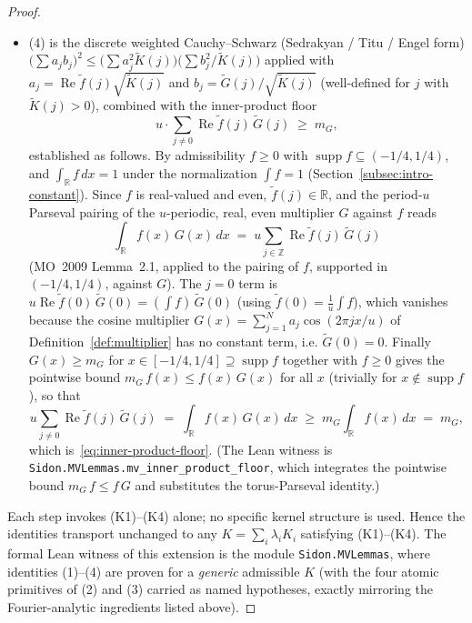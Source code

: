 \documentclass[11pt, letterpaper]{article}
\theoremstyle{paperplain}
\theoremstyle{paperdef}
\newcommand{\R}{\mathbb{R}}
\newcommand{\Z}{\mathbb{Z}}
\newcommand{\supp}{\operatorname{supp}}
\begin{document}
\begin{proof}
\begin{itemize}[leftmargin=2em]
       alone suffices and follows from $\widetilde{K}(j)\ge 0$ (K4)
       without the full period-$u$ summation.
\item (4) is the discrete weighted Cauchy--Schwarz
       (Sedrakyan / Titu / Engel form)
       $\bigl(\sum a_j b_j\bigr)^{2}\le\bigl(\sum a_j^{2}\widetilde{K}(j)\bigr)\bigl(\sum b_j^{2}/\widetilde{K}(j)\bigr)$
       applied with
       $a_j=\operatorname{Re}\widetilde{f}(j)\sqrt{\widetilde{K}(j)}$ and
       $b_j=\widetilde{G}(j)/\sqrt{\widetilde{K}(j)}$
       (well-defined for $j$ with $\widetilde{K}(j)>0$),
       combined with the inner-product floor
       \begin{equation}\label{eq:inner-product-floor}
         u\cdot\sum_{j\ne 0}\operatorname{Re}\widetilde{f}(j)\,\widetilde{G}(j)\;\ge\; m_G,
       \end{equation}
       established as follows.  By admissibility $f\ge 0$ with
       $\supp f\subseteq(-1/4,1/4)$, and $\int_{\R}f\,dx=1$ under the
       normalization $\int f=1$ (Section~\ref{subsec:intro-constant}).
       Since $f$ is real-valued and even, $\widetilde{f}(j)\in\R$, and
       the period-$u$ Parseval pairing of the $u$-periodic, real,
       even multiplier $G$ against $f$ reads
       \[
         \int_{\R}f(x)\,G(x)\,dx
         \;=\;u\sum_{j\in\Z}\operatorname{Re}\widetilde{f}(j)\,\widetilde{G}(j)
       \]
       (MO~2009 Lemma~2.1, applied to the pairing of $f$, supported in
       $(-1/4,1/4)$, against $G$).  The $j=0$ term is
       $u\operatorname{Re}\widetilde{f}(0)\,\widetilde{G}(0)=(\int f)\,\widetilde{G}(0)$
       (using $\widetilde{f}(0)=\tfrac1u\int f$),
       which vanishes because the cosine multiplier
       $G(x)=\sum_{j=1}^{N}a_j\cos(2\pi jx/u)$ of
       Definition~\ref{def:multiplier} has no constant term, i.e.
       $\widetilde{G}(0)=0$.  Finally $G(x)\ge m_G$ for
       $x\in[-1/4,1/4]\supseteq\supp f$ together with $f\ge 0$ gives
       the pointwise bound $m_G\,f(x)\le f(x)\,G(x)$ for all $x$
       (trivially for $x\notin\supp f$), so that
       \[
         u\sum_{j\ne 0}\operatorname{Re}\widetilde{f}(j)\,\widetilde{G}(j)
         \;=\;\int_{\R}f(x)\,G(x)\,dx
         \;\ge\;m_G\int_{\R}f(x)\,dx
         \;=\;m_G,
       \]
       which is~\eqref{eq:inner-product-floor}.  (The Lean witness is
       \texttt{Sidon.MVLemmas.mv\_inner\_product\_floor}, which
       integrates the pointwise bound $m_G\,f\le f\,G$ and substitutes
       the torus-Parseval identity.)
\end{itemize}
Each step invokes (K1)--(K4) alone; no specific kernel structure is
used.  Hence the identities transport unchanged to any
$K=\sum_i\lambda_i K_i$ satisfying (K1)--(K4).  The formal Lean
witness of this extension is the module \texttt{Sidon.MVLemmas},
where identities (1)--(4) are proven for a \emph{generic} admissible
$K$ (with the four atomic primitives of (2) and (3) carried as
named hypotheses, exactly mirroring the Fourier-analytic ingredients
listed above).
\end{proof}
\end{document}
